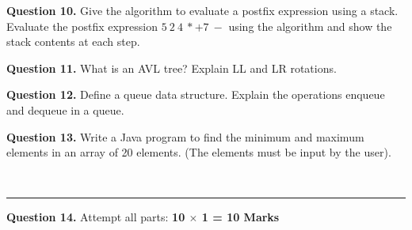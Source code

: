 \documentclass[11pt,a4paper]{article}
\begin{document}
\noindent   \textbf{Question 10.} Give the algorithm to evaluate a postfix expression using a stack. Evaluate the postfix expression $5\ 2\ 4\ * + 7\ -$ using the algorithm and show the stack contents at each step.

\medskip



\noindent   \textbf{Question 11.} What is an AVL tree? Explain LL and LR rotations.

\medskip



\noindent   \textbf{Question 12.} Define a queue data structure. Explain the operations enqueue and dequeue in a queue.

\medskip



\noindent   \textbf{Question 13.} Write a Java program to find the minimum and maximum elements in an array of 20 elements. (The elements must be input by the user).

\bigskip


\\[4pt]
\rule{\linewidth}{0.4pt}\smallskip




\noindent   \textbf{Question 14.} Attempt all parts: \hfill   \textbf{10 $ \times$ 1 = 10 Marks}
\end{document}
